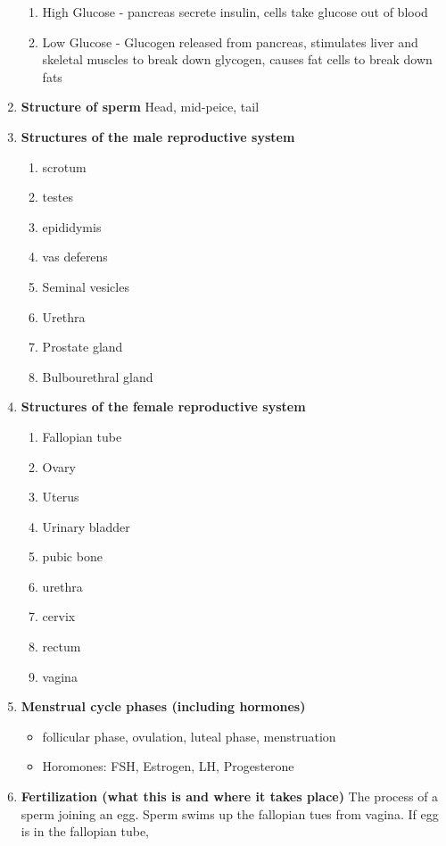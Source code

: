 \documentclass[9pt]{article}
\begin{document}
\begin{enumerate}
  \begin{enumerate}
    \item High Glucose - pancreas secrete insulin, cells take glucose out of blood
    \item Low Glucose - Glucogen released from pancreas, stimulates liver and skeletal muscles to break down glycogen, causes fat cells to break down fats
  \end{enumerate}
  \item {\bf Structure of sperm} Head, mid-peice, tail
  \item {\bf Structures of the male reproductive system}
  \begin{enumerate}
    \item scrotum
    \item testes
    \item epididymis
    \item vas deferens
    \item Seminal vesicles
    \item Urethra
    \item Prostate gland
    \item Bulbourethral gland
  \end{enumerate}
  \item {\bf Structures of the female reproductive system}
  \begin{enumerate}
    \item Fallopian tube
    \item Ovary
    \item Uterus
    \item Urinary bladder
    \item pubic bone
    \item urethra
    \item cervix
    \item rectum
    \item vagina
  \end{enumerate}
  \item {\bf Menstrual cycle phases (including hormones)}
    \begin{itemize}
    \item follicular phase, ovulation, luteal phase, menstruation
    \item Horomones: FSH, Estrogen, LH, Progesterone
    \end{itemize}
  \item {\bf Fertilization (what this is and where it takes place)}
    The process of a sperm joining an egg. Sperm swims up the
    fallopian tues from vagina. If egg is in the fallopian tube,

\end{enumerate}
\end{document}
